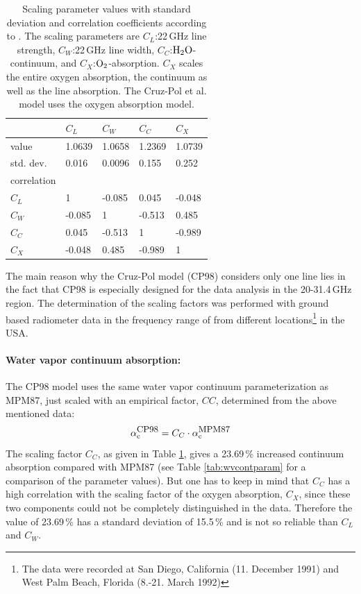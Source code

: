 \begin{table}[!htb]
\begin{center}
\begin{tabular}{lllll}
\hline
            & $C_L$ & $C_W$ & $C_C$ & $C_X$ \\
\hline
value       & 1.0639 & 1.0658 & 1.2369 & 1.0739\\
std. dev.   & 0.016  & 0.0096 & 0.155  & 0.252\\
\hline
correlation & &&&\\
$C_L$       & 1      & -0.085 & 0.045  & -0.048\\
$C_W$       & -0.085 & 1      & -0.513 &  0.485\\
$C_C$       & 0.045  & -0.513 & 1      & -0.989\\
$C_X$       & -0.048 & 0.485  & -0.989 & 1\\
\hline
\end{tabular}
\end{center}
\caption[CP98 scaling parameter values.]{Scaling parameter values with standard deviation and 
  correlation coefficients according to \citep{cruzpol:98}.
  The scaling parameters are $C_L$:22\,GHz line strength, 
  $C_W$:22\,GHz line width, $C_C$:$\mbox{H}_2\mbox{O}$-continuum, and 
  $C_X$:$\mbox{O}_2$-absorption. $C_X$ scales the entire oxygen absorption, 
  the continuum as well as the line absorption. The Cruz-Pol et al.
  model uses the \citet{pwr:93} oxygen absorption model.}
\label{tab:cp_orr}
\end{table}

The main reason why the Cruz-Pol model (CP98) considers only one line
lies in the fact that CP98 is especially designed for the data analysis
in the 20-31.4\,GHz region. The determination of the scaling factors was 
performed with ground based radiometer data in the frequency range of
from different locations\footnote{The data were recorded at San Diego, 
California (11. December 1991) and West Palm Beach, Florida 
(8.-21. March 1992)} in the USA.


\paragraph{Water vapor continuum absorption:}
\label{levele:cp98_h2ocont}
The CP98 model uses the same water vapor continuum 
parameterization as MPM87, just scaled with an empirical 
factor, $CC$, determined from the above mentioned data:
\begin{equation}
 \label{eq:abs_theory:cp98_cont_scaling}
 \alpha^{\mbox{\rm \small CP98}}_{\rm c} = C_C \cdot \alpha^{\mbox{\rm \small MPM87}}_{\rm c} 
\end{equation}
The scaling factor $C_C$, as given in Table \ref{tab:cp_orr}, 
gives a 23.69\,\% increased continuum absorption compared 
with MPM87 (see Table \ref{tab:wvcontparam} for a comparison of the 
parameter values). But one has to keep in mind that $C_C$ has a 
high correlation with the scaling factor of the oxygen 
absorption, $C_X$, since these two components could not 
be completely distinguished in the data. Therefore the 
value of 23.69\,\% has a standard deviation of 15.5\,\% 
and is not so reliable than $C_L$ and $C_W$.





